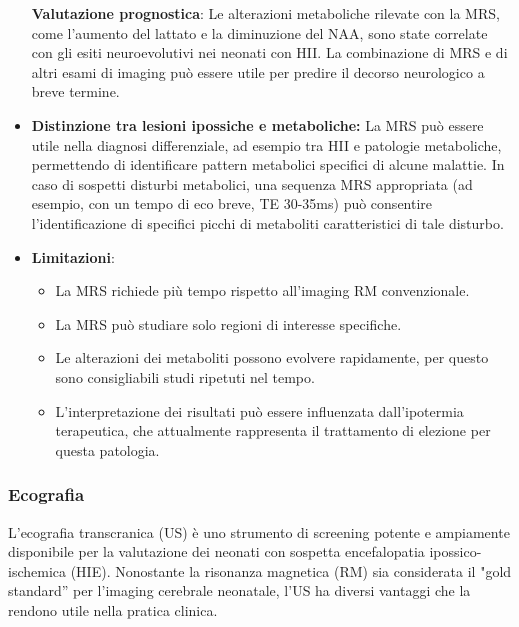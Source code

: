 \begin{itemize}
	\textbf{Valutazione prognostica}: Le alterazioni metaboliche rilevate con la MRS, come l'aumento del lattato e la diminuzione del NAA, sono state correlate con gli esiti neuroevolutivi nei neonati con HII. La combinazione di MRS e di altri esami di imaging può essere utile per predire il decorso neurologico a breve termine.
	\item
	\textbf{Distinzione tra lesioni ipossiche e metaboliche:} La MRS può essere utile nella diagnosi differenziale, ad esempio tra HII e patologie metaboliche, permettendo di identificare pattern metabolici specifici di alcune malattie. In caso di sospetti disturbi metabolici, una sequenza MRS appropriata (ad esempio, con un tempo di eco breve, TE 30-35ms) può consentire l'identificazione di specifici picchi di metaboliti caratteristici di tale disturbo.
	\item
	\textbf{Limitazioni}:
	
	\begin{itemize}
		\tightlist
		\item
		La MRS richiede più tempo rispetto all'imaging RM convenzionale.
		\item
		La MRS può studiare solo regioni di interesse specifiche.
		\item
		Le alterazioni dei metaboliti possono evolvere rapidamente, per questo sono consigliabili studi ripetuti nel tempo.
		\item
		L'interpretazione dei risultati può essere influenzata dall'ipotermia terapeutica, che attualmente rappresenta il trattamento di elezione per questa patologia.
	\end{itemize}
\end{itemize}

\subsubsection{Ecografia}

L'ecografia transcranica (US) è uno strumento di screening potente e ampiamente disponibile per la valutazione dei neonati con sospetta encefalopatia ipossico-ischemica (HIE). Nonostante la risonanza magnetica (RM) sia considerata il "gold standard'' per l'imaging cerebrale neonatale, l'US ha diversi vantaggi che la rendono utile nella pratica clinica.

